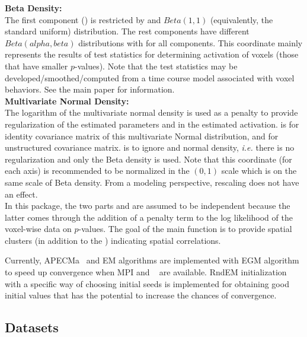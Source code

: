 {\bf Beta Density:}\\
The first component ()
is restricted by  and $Beta(1, 1)$ (equivalently,
the standard uniform) distribution. The rest  components have different 
$Beta(alpha, beta)$ distributions with  for all
 components.
This coordinate mainly represents the results of test statistics
for determining activation of voxels (those that have smaller $p$-values).
Note that the test statistics may be developed/smoothed/computed
from a time course model associated with voxel behaviors.
See the main paper \citet{ChenMaitra2021} for information.
\\

{\bf Multivariate Normal Density:}\\
The logarithm of the multivariate normal density is used as a penalty
to provide regularization of the estimated parameters and in the
estimated activation. 
 is for identity covariance matrix of this
multivariate Normal 
distribution, and  for unstructured covariance matrix.
 is to ignore  and normal density,
{\em i.e.} there is no regularization and only the Beta density is used.
Note that this coordinate (for each axis) is recommended to be
normalized in the $(0, 1)$ scale which is on the same scale of Beta
density. From a modeling perspective, rescaling  does not
have an effect. 
\\

In this package, the two parts  and  are
assumed to be independent because the latter comes through the
addition of a penalty term to the log likelihood of the voxel-wise data on
$p$-values. %
The goal of the main function is to provide spatial
clusters (in addition to the ) indicating spatial correlations.

Currently, APECMa~\citep{Chen2011}
and EM algorithms are implemented with EGM algorithm~\citep{Chen2013}
to speed up convergence when MPI and ~\citep{Chen2012}
are available.
RndEM initialization~\citep{Maitra2009} with a specific way of choosing
initial seeds is implemented for obtaining
good initial values that has the potential to increase the chances of
convergence. 


\subsection[Datasets]{Datasets}

